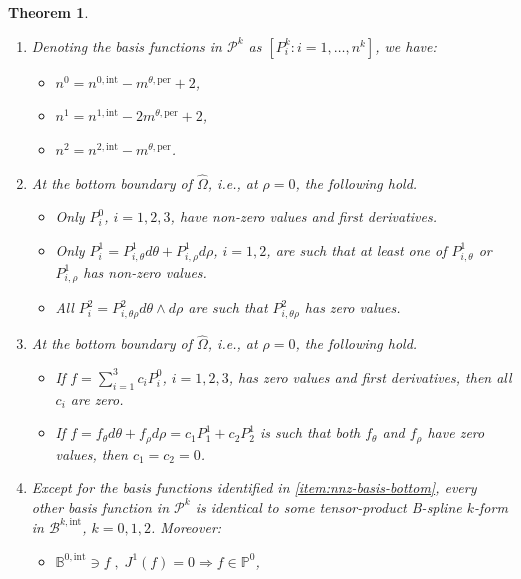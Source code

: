 \documentclass[10pt]{article}
\newcommand{\basis}[1]{\mathcal{#1}}
\newcommand{\vSpace}[1]{\mathbb{#1}}
\newcommand{\tpDomain}{\widehat{\Omega}}
\newcommand{\cU}{\theta}
\newcommand{\cV}{\rho}
\newcommand{\dcU}{\mathit{d\cU}}
\newcommand{\dcV}{\mathit{d\cV}}
\newcommand{\bsp}{B}
\newcommand{\bspB}{\basis{\bsp}}
\newcommand{\bspS}{\vSpace{\bsp}}
\newcommand{\per}{\mathrm{per}}
\newcommand{\pndofU}{m^{\cU,\per}}
\newcommand{\polar}{P}
\newcommand{\polarB}{\basis{\polar}}
\newcommand{\polarS}{\vSpace{\polar}}
\newcommand{\polarF}[1]{\polarS^{#1}}
\newcommand{\jet}[2]{J^{#1}\left(#2\right)}
\newcommand{\tint}{\mathrm{int}}
\theoremstyle{plain}
\newtheorem{theorem}{Theorem}[section]
\theoremstyle{definition}
\theoremstyle{remark}
\begin{document}
\begin{theorem}\label{thm:polar-splines}
    ~
    \begin{enumerate}[label=(\Alph*)]
        \item\label{item:cardinality} Denoting the basis functions in $\polarB^k$ as $\left[\polar^k_{i} : i = 1, \dots, n^k\right]$, we have:
        \begin{itemize}
            \item $n^0 = n^{0,\tint} - \pndofU + 2$,
            \item $n^1 = n^{1,\tint} - 2\pndofU + 2$,
            \item $n^2 = n^{2,\tint} - \pndofU$.
        \end{itemize}
        \item\label{item:nnz-basis-bottom} At the bottom boundary of $\tpDomain$, i.e., at $\cV = 0$, the following hold.
        \begin{itemize}
            \item Only $\polar^0_i$, $i = 1, 2, 3$, have non-zero values and first derivatives.
            \item Only $\polar^1_i = \polar^1_{i,\cU}\dcU + \polar^1_{i,\cV}\dcV$, $i = 1, 2$, are such that at least one of $\polar^1_{i,\cU}$ or $\polar^1_{i,\cV}$ has non-zero values.
            \item All $\polar^2_i = \polar^2_{i,\cU\cV}\dcU\wedge\dcV$ are such that $\polar^2_{i,\cU\cV}$ has zero values.
        \end{itemize}
        \item\label{item:linear-ind-bottom} At the bottom boundary of $\tpDomain$, i.e., at $\cV = 0$, the following hold.
        \begin{itemize}
            \item If $f = \sum_{i=1}^3 c_i \polar^0_i$, $i = 1, 2, 3$, has zero values and first derivatives, then all $c_i$ are zero.
            \item If $f = f_\cU\dcU + f_\cV\dcV = c_1 \polar^1_1 + c_2 \polar^1_2$ is such that both $f_\cU$ and $f_\cV$ have zero values, then $c_1 = c_2 = 0$.
        \end{itemize}
        \item\label{item:limited-influence} Except for the basis functions identified in \cref{item:nnz-basis-bottom}, every other basis function in $\polarB^k$ is identical to some tensor-product B-spline $k$-form in $\bspB^{k,\tint}$, $k = 0, 1, 2$. Moreover:
        \begin{itemize}
            \item $\bspS^{0,\tint} \ni f\;,\;\jet{1}{f} = 0 \Longrightarrow f \in \polarF{0}$,

\end{itemize}
\end{enumerate}
\end{theorem}
\end{document}
